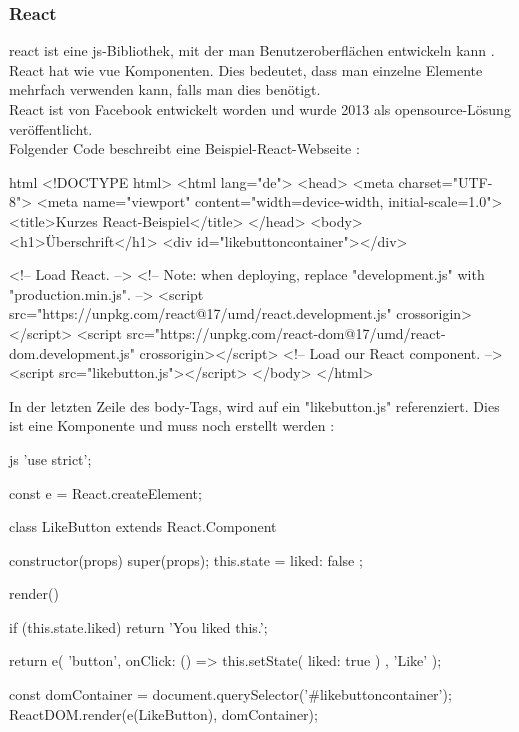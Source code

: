 \subsubsection{React}
\Gls{react} ist eine \Gls{js}-Bibliothek, mit der man Benutzeroberflächen entwickeln kann \cite{reactdoc}. React hat wie \Gls{vue} Komponenten. Dies bedeutet, dass man einzelne Elemente mehrfach verwenden kann, falls man dies benötigt.\\
React ist von Facebook entwickelt worden und wurde 2013 als \Gls{opensource}-Lösung veröffentlicht.\\
Folgender Code beschreibt eine Beispiel-React-Webseite \cite{reactdoc}:
\begin{code}{html}
	<!DOCTYPE html>
	<html lang="de">
		<head>
			<meta charset="UTF-8">
			<meta name="viewport" content="width=device-width, initial-scale=1.0">
			<title>Kurzes React-Beispiel</title>
		</head>
		<body>
			<h1>Überschrift</h1>
			<div id="likebuttoncontainer"></div>
			
			<!-- Load React. -->
			<!-- Note: when deploying, replace "development.js" with "production.min.js". -->
			<script src="https://unpkg.com/react@17/umd/react.development.js" crossorigin></script>
			<script src="https://unpkg.com/react-dom@17/umd/react-dom.development.js" crossorigin></script>
			<!-- Load our React component. -->
			<script src="likebutton.js"></script>
		</body>
	</html>
\end{code}
In der letzten Zeile des body-Tags, wird auf ein "likebutton.js" referenziert. Dies ist eine Komponente und muss noch erstellt werden \cite{reactdoc}:
\begin{code}{js}
	'use strict';
	
	const e = React.createElement;
	
	class LikeButton extends React.Component {
		constructor(props) {
			super(props);
			this.state = { liked: false };
		}
		
		render() {
			if (this.state.liked) {
				return 'You liked this.';
			}
			
			return e(
			'button',
			{ onClick: () => this.setState({ liked: true }) },
			'Like'
			);
		}
	}
	
	const domContainer = document.querySelector('#likebuttoncontainer');
	ReactDOM.render(e(LikeButton), domContainer);
\end{code}

